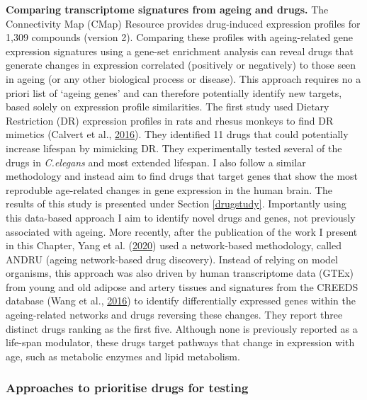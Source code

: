 \documentclass[12pt,twoside]{unicam}
\begin{document}
\textbf{Comparing transcriptome signatures from ageing and drugs.} The Connectivity Map (CMap) Resource provides drug-induced expression profiles for 1,309 compounds (version 2). Comparing these profiles with ageing-related gene expression signatures using a gene-set enrichment analysis can reveal drugs that generate changes in expression correlated (positively or negatively) to those seen in ageing (or any other biological process or disease). This approach requires no a priori list of `ageing genes' and can therefore potentially identify new targets, based solely on expression profile similarities. The first study used Dietary Restriction (DR) expression profiles in rats and rhesus monkeys to find DR mimetics (Calvert et al., \protect\hyperlink{ref-Calvert2016}{2016}). They identified 11 drugs that could potentially increase lifespan by mimicking DR. They experimentally tested several of the drugs in \emph{C.elegans} and most extended lifespan. I also follow a similar methodology and instead aim to find drugs that target genes that show the most reproduble age-related changes in gene expression in the human brain. The results of this study is presented under Section \ref{drugstudy}. Importantly using this data-based approach I aim to identify novel drugs and genes, not previously associated with ageing. More recently, after the publication of the work I present in this Chapter, Yang et al. (\protect\hyperlink{ref-Yang2018}{2020}) used a network-based methodology, called ANDRU (ageing network-based drug discovery). Instead of relying on model organisms, this approach was also driven by human transcriptome data (GTEx) from young and old adipose and artery tissues and signatures from the CREEDS database (Wang et al., \protect\hyperlink{ref-Wang2016}{2016}) to identify differentially expressed genes within the ageing-related networks and drugs reversing these changes. They report three distinct drugs ranking as the first five. Although none is previously reported as a life-span modulator, these drugs target pathways that change in expression with age, such as metabolic enzymes and lipid metabolism.

\hypertarget{approaches-to-prioritise-drugs-for-testing}{%
\subsubsection{Approaches to prioritise drugs for testing}\label{approaches-to-prioritise-drugs-for-testing}}
\end{document}
